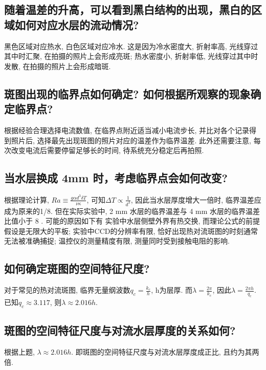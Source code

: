 \documentclass[font=default]{mpltx}
\begin{document}
\subsection{随着温差的升高，可以看到黑白结构的出现，黑白的区域如何对应水层的流动情况?}
黑色区域对应热水, 白色区域对应冷水. 这是因为冷水密度大, 折射率高, 光线穿过其中时汇聚, 在拍摄的照片上会形成亮斑; 热水密度小, 折射率低, 光线穿过其中时发散, 在拍摄的照片上会形成暗斑.
\subsection{斑图出现的临界点如何确定? 如何根据所观察的现象确定临界点?}
根据经验合理选择电流数值, 在临界点附近适当减小电流步长, 并比对各个记录得到照片后, 选择最先出现斑图的照片对应的温差作为临界温差.
此外还需要注意, 每次改变电流后需要停留足够长的时间, 待系统充分稳定后再拍照.
\subsection{当水层换成 4mm 时，考虑临界点会如何改变?}
根据理论计算, $Ra\equiv\frac{g\alpha d^3\delta T}{\nu\kappa}$, 可知$\Delta T \propto \frac{1}{d^3}$, 因此当水层厚度增大一倍时, 临界温差应成为原来的1/8.
但在实际实验中, 2 mm 水层的临界温差与 4 mm 水层的临界温差比值小于 8 . 可能的原因如下有
实验中水层侧壁外界有热交换, 而理论公式的前提假设是无限大的平板; 
实验中CCD的分辨率有限, 恰好出现热对流斑图的时刻通常无法被准确捕捉;
温控仪的测量精度有限, 测量同时受到接触电阻的影响.

\subsection{如何确定斑图的空间特征尺度?}
对于常见的热对流斑图, 临界无量纲波数$q_c = \frac{k_c}{h}$, h为层厚. 而$\lambda = \frac{2\pi}{k_c}$, 因此$\lambda = \frac{2\pi h}{q_c}$.
已知$q_c \approx 3.117$, 则$\lambda \approx 2.016 h$.
\subsection{斑图的空间特征尺度与对流水层厚度的关系如何?}
根据上题, $\lambda \approx 2.016 h$. 即斑图的空间特征尺度与对流水层厚度成正比, 且约为其两倍.
\end{document}
